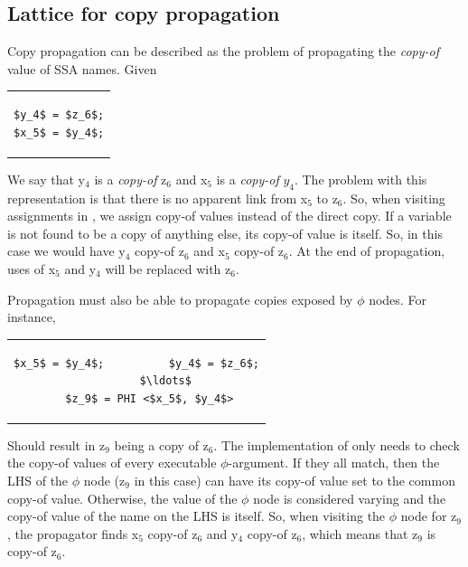 \subsection{Lattice for copy propagation}

Copy propagation can be described as the problem of propagating
the \textit{copy-of} value of SSA names.  Given

\begin{center}
  \begin{tabular}{c}
    \begin{lstlisting}
$y_4$ = $z_6$;
$x_5$ = $y_4$;
    \end{lstlisting}
  \end{tabular}
\end{center}

We say that y$_4$ is a \textit{copy-of} z$_6$ and x$_5$ is a
\textit{copy-of} $y_4$.  The problem with this representation is
that there is no apparent link from x$_5$ to z$_6$.  So, when
visiting assignments in , we assign
copy-of values instead of the direct copy.  If a variable is not
found to be a copy of anything else, its copy-of value is itself.
So, in this case we would have y$_4$ copy-of z$_6$ and x$_5$
copy-of z$_6$.  At the end of propagation, uses of x$_5$ and y$_4$
will be replaced with z$_6$.


Propagation must also be able to propagate copies exposed by
$\phi$ nodes.  For instance,

\begin{center}
  \begin{tabular}{c}
    \begin{lstlisting}
$x_5$ = $y_4$;          $y_4$ = $z_6$;
         $\ldots$
    $z_9$ = PHI <$x_5$, $y_4$>
    \end{lstlisting}
  \end{tabular}
\end{center}

Should result in z$_9$ being a copy of z$_6$.  The implementation
of  only needs to check the copy-of
values of every executable $\phi$-argument.  If they all match,
then the LHS of the $\phi$ node (z$_9$ in this case) can have its
copy-of value set to the common copy-of value.  Otherwise, the
value of the $\phi$ node is considered varying and the copy-of
value of the name on the LHS is itself.  So, when visiting the
$\phi$ node for z$_9$, the propagator finds x$_5$ copy-of z$_6$
and y$_4$ copy-of z$_6$, which means that z$_9$ is copy-of z$_6$.

